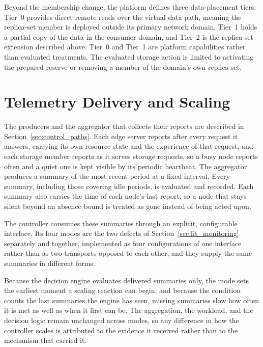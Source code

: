 ﻿\documentclass[12pt,reqno,twoside]{amsbook}
\begin{document}
Beyond the membership change, the platform defines three data-placement
tiers: Tier~0 provides direct remote reads over the virtual data path, 
meaning the replica-set member is deployed outside its
primary network domain, Tier~1 holds a partial copy of the data in the consumer
domain, and Tier~2 is the replica-set extension described above. Tier~0 and
Tier~1 are platform capabilities rather than evaluated treatments. The
evaluated storage action is limited to activating the prepared
reserve or removing a member of the domain's own replica set.

\section{Telemetry Delivery and Scaling}\label{sec:monitoring_decision}
The producers and the aggregator that collects their reports are described
in Section~\ref{sec:control_paths}. Each edge server reports after every
request it answers, carrying its own resource state and the experience of
that request, and each storage member reports as it serves storage requests,
so a busy node reports often and a quiet one is kept visible by
its periodic heartbeat. The aggregator produces a summary of the most recent
period at a fixed interval. Every summary, including those covering idle
periods, is evaluated and recorded. Each summary
also carries the time of each node's last report,
so a node that stays silent beyond an absence bound is treated as gone
instead of being acted upon.

The controller consumes these summaries through an explicit, configurable
interface. Its four modes are the two defects of Section~\ref{sec:lit_monitoring}
separately and together, implemented as four configurations of one interface
rather than as two transports opposed to each other, and they supply the same
summaries in different forms.

Because the decision engine evaluates delivered summaries only, the mode sets
the earliest moment a scaling reaction can begin, and because the condition
counts the last summaries the engine has seen, missing summaries slow how
often it is met as well as when it first can be. The aggregation, the
workload, and the decision logic remain unchanged across modes, so any
difference in how the controller scales is attributed to the evidence it
received rather than to the mechanism that carried it.
\end{document}
